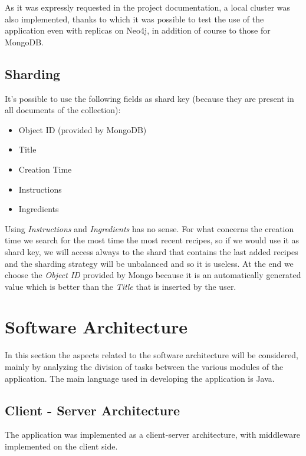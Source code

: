 \documentclass[a4paper]{report}
\begin{document}
\noindent As it was expressly requested in the project documentation, a local cluster was also implemented, thanks to which it was possible to test the use of the application even with replicas on Neo4j, in addition of course to those for MongoDB.

\subsection{Sharding}
It's possible to use the following fields as shard key (because they are present in all documents of the collection):
\begin{itemize}
	\item Object ID (provided by MongoDB)
	\item Title
	\item Creation Time
	\item Instructions
	\item Ingredients
\end{itemize}

\noindent Using \emph{Instructions} and \emph{Ingredients} has no sense. For what concerns the creation time we search for the most time the most recent recipes, so if we would use it as shard key, we will access always to the shard that contains the last added recipes and the sharding strategy will be unbalanced and so it is useless. At the end we choose the \emph{Object ID} provided by Mongo because it is an automatically generated value which is better than the \emph{Title} that is inserted by the user.


\section{Software Architecture}
In this section the aspects related to the software architecture will be considered, mainly by analyzing the division of tasks between the various modules of the application. The main language used in developing the application is Java.
\subsection{Client - Server Architecture}
The application was implemented as a client-server architecture, with middleware implemented on the client side.
\end{document}
